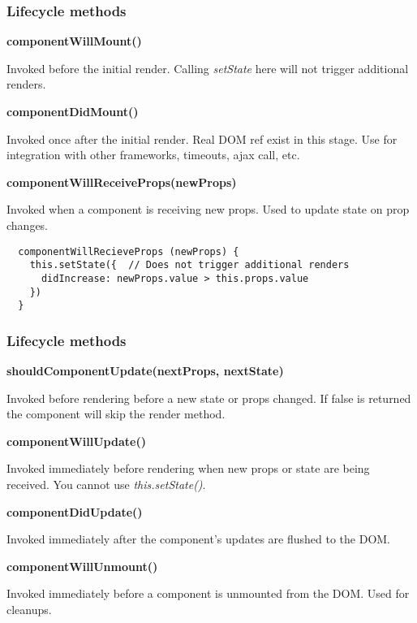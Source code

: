 \begin{frame}[fragile]

  \frametitle{Lifecycle methods}
  \textbf{componentWillMount()}

  \small Invoked before the initial render. Calling \textit{setState} here will not trigger additional renders.

  \textbf{componentDidMount()}

  \small Invoked once after the initial render. Real DOM ref exist in this stage.  Use for integration with other frameworks, timeouts, ajax call, etc.

  \textbf{componentWillReceiveProps(newProps)}

  \small Invoked when a component is receiving new props. Used to update state on prop changes.
  \begin{verbatim}
  componentWillRecieveProps (newProps) {
    this.setState({  // Does not trigger additional renders
      didIncrease: newProps.value > this.props.value
    })
  }
  \end{verbatim}

\end{frame}

\begin{frame}[fragile]

  \frametitle{Lifecycle methods}
  \textbf{shouldComponentUpdate(nextProps, nextState)}

  \small Invoked before rendering before a new state or props changed. If false is returned the component will skip the render method.

  \textbf{componentWillUpdate()}

  \small Invoked immediately before rendering when new props or state are being received. You cannot use \textit{this.setState()}.

  \textbf{componentDidUpdate()}

  \small Invoked immediately after the component's updates are flushed to the DOM.

  \textbf{componentWillUnmount()}

  \small Invoked immediately before a component is unmounted from the DOM. Used for cleanups.

\end{frame}

